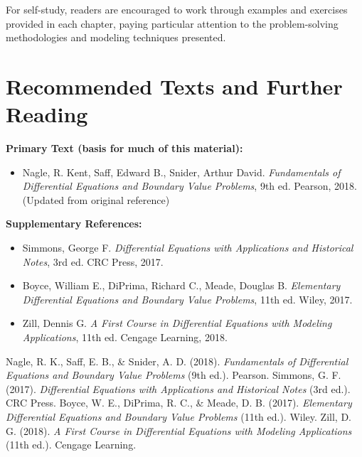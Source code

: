 \documentclass[12pt, letterpaper]{book}
\theoremstyle{problemstyle}
\theoremstyle{solutionstyle}
\begin{document}
For self-study, readers are encouraged to work through examples and exercises provided in each chapter, paying particular attention to the problem-solving methodologies and modeling techniques presented.

\chapter{Recommended Texts and Further Reading}
\label{app:texts}
\textbf{Primary Text (basis for much of this material):}
\begin{itemize}
    \item Nagle, R. Kent, Saff, Edward B., Snider, Arthur David. \textit{Fundamentals of Differential Equations and Boundary Value Problems}, 9th ed. Pearson, 2018. (Updated from original reference)
\end{itemize}

\textbf{Supplementary References:}
\begin{itemize}
    \item Simmons, George F. \textit{Differential Equations with Applications and Historical Notes}, 3rd ed. CRC Press, 2017.
    \item Boyce, William E., DiPrima, Richard C., Meade, Douglas B. \textit{Elementary Differential Equations and Boundary Value Problems}, 11th ed. Wiley, 2017.
    \item Zill, Dennis G. \textit{A First Course in Differential Equations with Modeling Applications}, 11th ed. Cengage Learning, 2018.
\end{itemize}

\backmatter %
% 

\begin{thebibliography}{9}
     Nagle, R. K., Saff, E. B., \& Snider, A. D. (2018). \textit{Fundamentals of Differential Equations and Boundary Value Problems} (9th ed.). Pearson.
     Simmons, G. F. (2017). \textit{Differential Equations with Applications and Historical Notes} (3rd ed.). CRC Press.
     Boyce, W. E., DiPrima, R. C., \& Meade, D. B. (2017). \textit{Elementary Differential Equations and Boundary Value Problems} (11th ed.). Wiley.
     Zill, D. G. (2018). \textit{A First Course in Differential Equations with Modeling Applications} (11th ed.). Cengage Learning.
\end{thebibliography}
\end{document}
